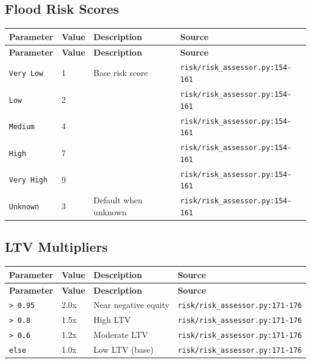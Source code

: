 \documentclass[11pt,a4paper]{article}
\begin{document}
\subsection{Flood Risk Scores}

\begin{longtable}{p{4cm}p{4cm}p{5.5cm}p{3.5cm}}
    \toprule
    \textbf{Parameter} & \textbf{Value} & \textbf{Description} & \textbf{Source} \\
    \midrule
    \endfirsthead
    \toprule
    \textbf{Parameter} & \textbf{Value} & \textbf{Description} & \textbf{Source} \\
    \midrule
    \endhead
    \bottomrule
    \endfoot
    \texttt{Very Low} & 1 & Base risk score & {\scriptsize \texttt{risk/risk\_assessor.py:154-161}} \\
    \texttt{Low} & 2 &  & {\scriptsize \texttt{risk/risk\_assessor.py:154-161}} \\
    \texttt{Medium} & 4 &  & {\scriptsize \texttt{risk/risk\_assessor.py:154-161}} \\
    \texttt{High} & 7 &  & {\scriptsize \texttt{risk/risk\_assessor.py:154-161}} \\
    \texttt{Very High} & 9 &  & {\scriptsize \texttt{risk/risk\_assessor.py:154-161}} \\
    \texttt{Unknown} & 3 & Default when unknown & {\scriptsize \texttt{risk/risk\_assessor.py:154-161}} \\
\end{longtable}

\subsection{LTV Multipliers}

\begin{longtable}{p{4cm}p{4cm}p{5.5cm}p{3.5cm}}
    \toprule
    \textbf{Parameter} & \textbf{Value} & \textbf{Description} & \textbf{Source} \\
    \midrule
    \endfirsthead
    \toprule
    \textbf{Parameter} & \textbf{Value} & \textbf{Description} & \textbf{Source} \\
    \midrule
    \endhead
    \bottomrule
    \endfoot
    \texttt{> 0.95} & 2.0x & Near negative equity & {\scriptsize \texttt{risk/risk\_assessor.py:171-176}} \\
    \texttt{> 0.8} & 1.5x & High LTV & {\scriptsize \texttt{risk/risk\_assessor.py:171-176}} \\
    \texttt{> 0.6} & 1.2x & Moderate LTV & {\scriptsize \texttt{risk/risk\_assessor.py:171-176}} \\
    \texttt{else} & 1.0x & Low LTV (base) & {\scriptsize \texttt{risk/risk\_assessor.py:171-176}} \\
\end{longtable}
\end{document}

